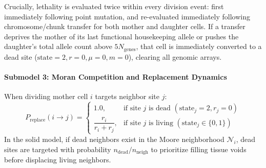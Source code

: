\documentclass[11pt,a4paper]{article}
\begin{document}
Crucially, lethality is evaluated twice within every division event: first immediately following point mutation, and re-evaluated immediately following chromosome/chunk transfer for both mother and daughter cells. If a transfer deprives the mother of its last functional housekeeping allele or pushes the daughter's total allele count above $5 N_{\text{genes}}$, that cell is immediately converted to a dead site ($\text{state} = 2, r = 0, \mu = 0, m = 0$), clearing all genomic arrays.

\paragraph{Submodel 3: Moran Competition and Replacement Dynamics}
When dividing mother cell $i$ targets neighbor site $j$:
\begin{equation}
    P_{\text{replace}}(i \to j) = 
    \begin{cases}
        1.0, & \text{if site } j \text{ is dead } (\text{state}_j = 2, r_j = 0) \\[4pt]
        \dfrac{r_i}{r_i + r_j}, & \text{if site } j \text{ is living } (\text{state}_j \in \{0, 1\})
    \end{cases}
\end{equation}
In the solid model, if dead neighbors exist in the Moore neighborhood $\mathcal{N}_i$, dead sites are targeted with probability $n_{\text{dead}} / n_{\text{neigh}}$ to prioritize filling tissue voids before displacing living neighbors.
\end{document}
